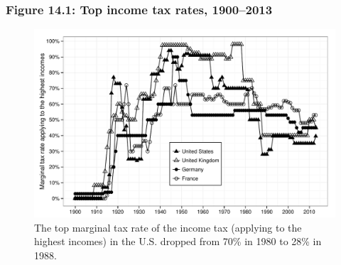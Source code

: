 \documentclass[t]{beamer}\usepackage[]{graphicx}\usepackage[]{color}
\newenvironment{knitrout}{}{} %
\begin{document}
\begin{frame}[label=Figure_14_1]
\frametitle{Figure 14.1: Top income tax rates, 1900--2013}
\begin{figure}[t]
\begin{minipage}[b]{\textwidth}
\centering
\begin{knitrout}\footnotesize
{}\color{fgcolor}

{\centering \includegraphics[width=1\linewidth]{figures/bw/Figure_14_1} 

}



\end{knitrout}
\caption{The top marginal tax rate of the income tax (applying to the highest incomes) in the U.S. dropped from 70\% in 1980 to 28\% in 1988.}
\end{minipage}
\end{figure}
\end{frame}
\end{document}
